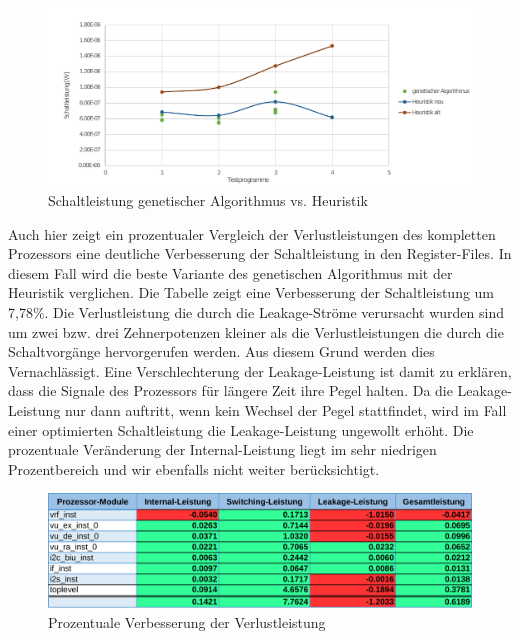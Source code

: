 %
\begin{figure}[H]
	\centering
	\includegraphics[width=\textwidth]{fig/schaltleistung_genetic_heuristik.pdf}
	\caption{Schaltleistung genetischer Algorithmus vs. Heuristik}
	\label{fig:eval_genetic_switching_power}
\end{figure}

Auch hier zeigt ein prozentualer Vergleich der Verlustleistungen des kompletten Prozessors eine deutliche Verbesserung der Schaltleistung in den Register-Files. In diesem Fall wird die beste Variante des genetischen Algorithmus mit der Heuristik verglichen. Die Tabelle zeigt eine Verbesserung der Schaltleistung um 7,78\%. Die Verlustleistung die durch die Leakage-Ströme verursacht wurden sind um zwei bzw. drei Zehnerpotenzen kleiner als die Verlustleistungen die durch die Schaltvorgänge hervorgerufen werden. Aus diesem Grund werden dies Vernachlässigt. Eine Verschlechterung der Leakage-Leistung ist damit zu erklären, dass die Signale des Prozessors für längere Zeit ihre Pegel halten. Da die Leakage-Leistung nur dann auftritt, wenn kein Wechsel der Pegel stattfindet, wird im Fall einer optimierten Schaltleistung die Leakage-Leistung ungewollt erhöht.
Die prozentuale Veränderung der Internal-Leistung liegt im sehr niedrigen Prozentbereich und wir ebenfalls nicht weiter berücksichtigt. 

\begin{figure}[H]
	\centering
	\includegraphics[width=\textwidth]{fig/power_percent_genetic.pdf}
	\caption{Prozentuale Verbesserung der Verlustleistung}
	\label{fig:power_percent_genetic}
\end{figure}



